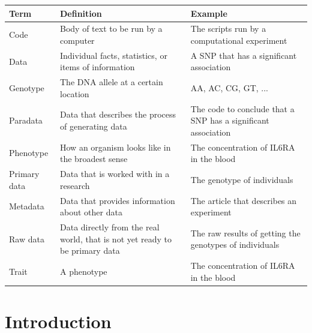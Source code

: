 \begin{table}[h]
  \begin{tabular}{lp{5cm}p{5cm}}
    Term      & Definition                                            & Example                                                         \\
    \hline
    Code      & Body of text to be run by a computer                  & The scripts run by a computational experiment                   \\
    Data      & Individual facts, statistics, or items of information & A SNP that has a significant association                        \\
    Genotype  & The DNA allele at a certain location                  & AA, AC, CG, GT, ...                                             \\
    Paradata  & Data that describes the process of generating data    & The code to conclude that a SNP has a significant association   \\
    Phenotype & How an organism looks like in the broadest sense      & The concentration of IL6RA in the blood                         \\
    Primary data & Data that is worked with in a research             & The genotype of individuals   \\
    Metadata  & Data that provides information about other data       & The article that describes an experiment                        \\
    Raw data  & Data directly from the real world, that is not yet ready to be primary data & The raw results of getting the genotypes of individuals   \\
    Trait     & A phenotype                                           & The concentration of IL6RA in the blood                         
  \end{tabular}
\end{table}

\section{Introduction}


